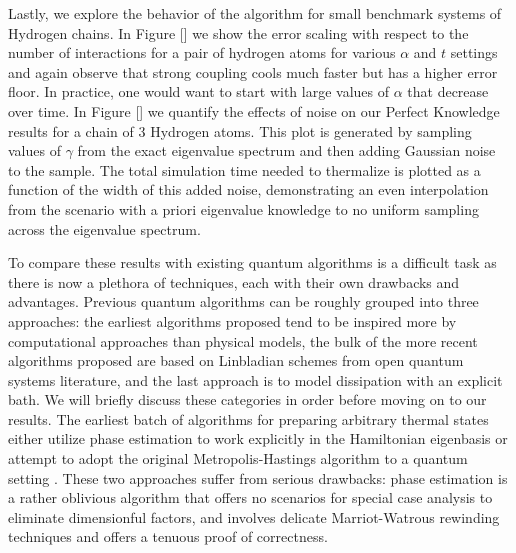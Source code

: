 \documentclass[11pt]{article}
\begin{document}
Lastly, we explore the behavior of the algorithm for small benchmark systems of Hydrogen chains. In Figure [] we show the error scaling with respect to the number of interactions for a pair of hydrogen atoms for various $\alpha$ and $t$ settings and again observe that strong coupling cools much faster but has a higher error floor. In practice, one would want to start with large values of $\alpha$ that decrease over time. In Figure [] we quantify the effects of noise on our Perfect Knowledge results for a chain of 3 Hydrogen atoms. This plot is generated by sampling values of $\gamma$ from the exact eigenvalue spectrum and then adding Gaussian noise to the sample. The total simulation time needed to thermalize is plotted as a function of the width of this added noise, demonstrating an even interpolation from the scenario with a priori eigenvalue knowledge to no uniform sampling across the eigenvalue spectrum.

To compare these results with existing quantum algorithms is a difficult task as there is now a plethora of techniques, each with their own drawbacks and advantages.
Previous quantum algorithms can be roughly grouped into three approaches: the earliest algorithms proposed tend to be inspired more by computational approaches than physical models, the bulk of the more recent algorithms proposed are based on Linbladian schemes from open quantum systems literature, and the last approach is to model dissipation with an explicit bath. We will briefly discuss these categories in order before moving on to our results. The earliest batch of algorithms for preparing arbitrary thermal states either utilize phase estimation to work explicitly in the Hamiltonian eigenbasis \cite{poulin2009sampling} or attempt to adopt the original Metropolis-Hastings algorithm to a quantum setting \cite{temme2011}. These two approaches suffer from serious drawbacks: phase estimation is a rather oblivious algorithm that offers no scenarios for special case analysis to eliminate dimensionful factors, and \cite{temme2011} involves delicate Marriot-Watrous rewinding techniques \cite{marriott2005quantum} and offers a tenuous proof of correctness.
\end{document}
